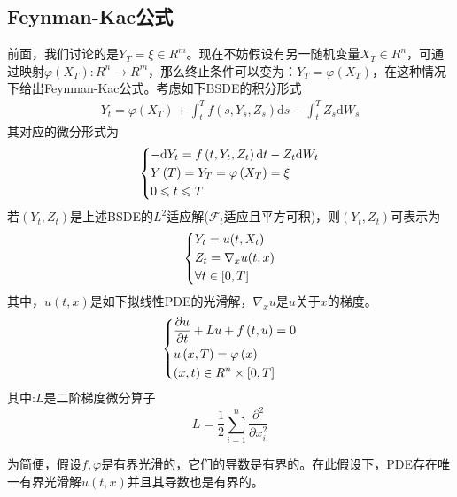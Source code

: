 	\subsection{Feynman-Kac公式}
		\par
		前面，我们讨论的是${{Y_T} = \xi  \in {R^m}}$。现在不妨假设有另一随机变量${X_T} \in {R^n}$，可通过映射$\varphi ( {{X_T}}):{R^n} \rightarrow {R^m}$，那么终止条件可以变为：${Y_T} = \varphi ( {{X_T}} )$，在这种情况下给出Feynman-Kac公式。考虑如下BSDE的积分形式
		\begin{align*}
		{Y_t} = \varphi \left( {{X_T}} \right) + \int_t^T {f\left( {s,{Y_s},{Z_s}} \right){\mathrm{d}s} - } \int_t^T {{Z_s}\mathrm{d}{W_s}}
		\end{align*}
		其对应的微分形式为
		\begin{equation*}
			\centering
			\left\{\begin{lgathered}
			{ - \mathrm{d}{Y_t} = f\left( {t,{Y_t},{Z_t}} \right){\mathrm{d}t} - {Z_t}\mathrm{d}{W_t}}\\
			{Y\left( T \right) = {Y_T} = \varphi \left( {{X_T}} \right) = \xi }\\
			{0 \leqslant t \leqslant T}
			\end{lgathered} \right.
		\end{equation*}
		 若$(Y_t,Z_t)$是上述BSDE的$L^2$适应解(${{\mathcal {F}}_t}$适应且平方可积)，则$(Y_t,Z_t)$可表示为
		\begin{equation*}
			\centering
			\left\{\begin{lgathered}
			{Y_t} = u( {t,{X_t}} )\\
			{Z_t} = {\nabla _x}u( {t,x} )\\
			\forall t \in [ 0,T]
			\end{lgathered} \right.
		\end{equation*}
		 其中，$u(t,x)$是如下拟线性PDE的光滑解，${\nabla _x}u$是$u$关于$x$的梯度。
		\begin{equation*}
			\centering
			\left\{\begin{lgathered}
			{\frac{{\partial u}}{{\partial t}} + {Lu} + f\left( {t,u} \right) = 0}\\
			{u\left( {x,T} \right) = \varphi \left( x \right)}\\
			{\left( {x,t} \right) \in {R^n} \times \left[ {0,T} \right]}
			\end{lgathered} \right.
		\end{equation*}
		其中:$L$是二阶梯度微分算子
		\begin{equation*}
			L = \frac{1}{2}\sum\limits_{i = 1}^n {\frac{{{\partial ^2}}}{{\partial x_i^2}}}
		\end{equation*}
		\par
		为简便，假设$f,\varphi$是有界光滑的，它们的导数是有界的。在此假设下，PDE存在唯一有界光滑解$u(t,x)$并且其导数也是有界的。

